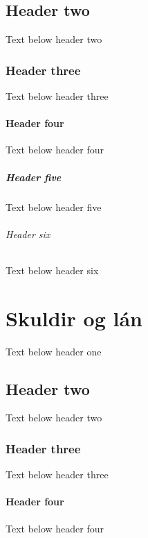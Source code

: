 \documentclass[a4paper,10pt,icelandic]{sphinxmanual}
\begin{document}
\section{Header two}
\label{\detokenize{sparnadur-og-fjarfestingar/index:header-two}}
\sphinxAtStartPar
Text below header two


\subsection{Header three}
\label{\detokenize{sparnadur-og-fjarfestingar/index:header-three}}
\sphinxAtStartPar
Text below header three


\subsubsection{Header four}
\label{\detokenize{sparnadur-og-fjarfestingar/index:header-four}}
\sphinxAtStartPar
Text below header four


\paragraph{Header five}
\label{\detokenize{sparnadur-og-fjarfestingar/index:header-five}}
\sphinxAtStartPar
Text below header five


\subparagraph{Header six}
\label{\detokenize{sparnadur-og-fjarfestingar/index:header-six}}
\sphinxAtStartPar
Text below header six

\sphinxstepscope


\chapter{Skuldir og lán}
\label{\detokenize{skuldir-og-lan/index:skuldir-og-lan}}\label{\detokenize{skuldir-og-lan/index::doc}}
\sphinxAtStartPar
Text below header one


\section{Header two}
\label{\detokenize{skuldir-og-lan/index:header-two}}
\sphinxAtStartPar
Text below header two


\subsection{Header three}
\label{\detokenize{skuldir-og-lan/index:header-three}}
\sphinxAtStartPar
Text below header three


\subsubsection{Header four}
\label{\detokenize{skuldir-og-lan/index:header-four}}
\sphinxAtStartPar
Text below header four
\end{document}
